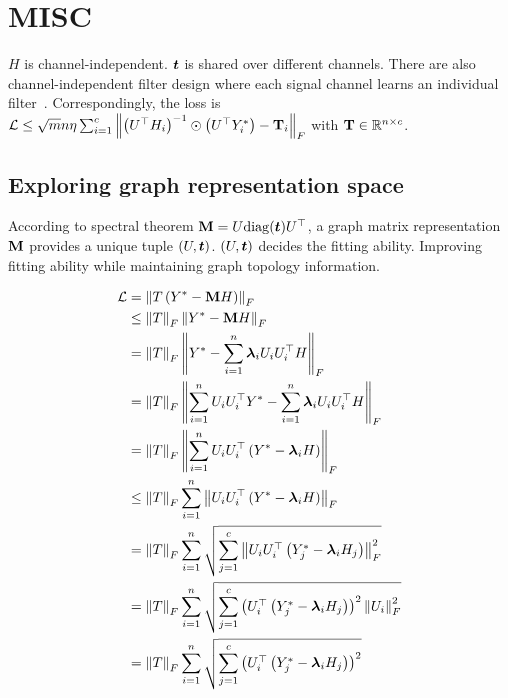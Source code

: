 \documentclass{article} %
\def\vlambda{{\bm\lambda}}
\begin{document}
	
	\newpage
	
	\section{MISC}
	
	$H$ is channel-independent.
	${\bm{t}}$ is shared over different channels.
	There are also channel-independent filter design where each signal channel learns an individual filter~\citep{yang2022spectrum,JacobiConv,bo2022specformer}.
	Correspondingly, the loss is ${\mathcal{L}}\leq\sqrt{m}n\eta\sum_{i=1}^c\left\|\left(U^{\top}H_i\right)^{-1}\odot\left(U^{\top}Y^*_i\right)-{\mathbf{T}}_i\right\|_F$ with ${\mathbf{T}}\in{\mathbb{R}}^{n\times c}$.
	
	\subsection{Exploring graph representation space}
	According to spectral theorem ${\mathbf{M}}=U\mathrm{diag}({\bm{t}})U^{\top}$, a graph matrix representation ${\mathbf{M}}$ provides a unique tuple $(U,{\bm{t}})$.
	$(U,{\bm{t}})$ decides the fitting ability.
	Improving fitting ability while maintaining graph topology information.
	
	\begin{equation}
		\begin{aligned}
			\gL&=\left\|T\left(Y^*-\rmM H\right)\right\|_F\\
			&\leq\left\|T\right\|_F\left\|Y^*-\rmM H\right\|_F\\
			&=\left\|T\right\|_F\left\|Y^*-\sum_{i=1}^n\vlambda_iU_iU_i^{\top}H\right\|_F\\
			&=\left\|T\right\|_F\left\|\sum_{i=1}^nU_iU_i^{\top}Y^*-\sum_{i=1}^n\vlambda_iU_iU_i^{\top}H\right\|_F\\
			&=\left\|T\right\|_F\left\|\sum_{i=1}^nU_iU_i^{\top}\left(Y^*-\vlambda_iH\right)\right\|_F\\
			&\leq\left\|T\right\|_F\sum_{i=1}^n\left\|U_iU_i^{\top}\left(Y^*-\vlambda_iH\right)\right\|_F\\
			&=\left\|T\right\|_F\sum_{i=1}^n\sqrt{\sum_{j=1}^c\left\|U_iU_i^{\top}\left(Y^*_j-\vlambda_iH_j\right)\right\|^2_F}\\
			&=\left\|T\right\|_F\sum_{i=1}^n\sqrt{\sum_{j=1}^c\left(U_i^{\top}\left(Y^*_j-\vlambda_iH_j\right)\right)^2\left\|U_i\right\|^2_F}\\
			&=\left\|T\right\|_F\sum_{i=1}^n\sqrt{\sum_{j=1}^c\left(U_i^{\top}\left(Y^*_j-\vlambda_iH_j\right)\right)^2}
		\end{aligned}
	\end{equation}
	
\end{document}
